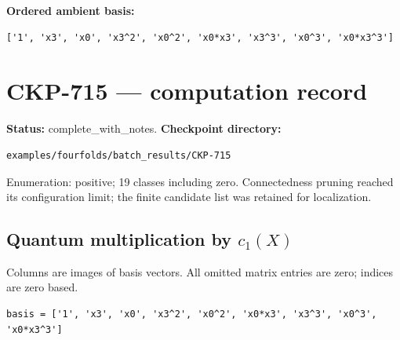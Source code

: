 \documentclass[10pt,a4paper]{article}
\begin{document}
\textbf{Ordered ambient basis:}
\begin{lstlisting}
['1', 'x3', 'x0', 'x3^2', 'x0^2', 'x0*x3', 'x3^3', 'x0^3', 'x0*x3^3']
\end{lstlisting}

\clearpage\section*{CKP-715 --- computation record}
\textbf{Status:} complete\_with\_notes.
\textbf{Checkpoint directory:}
\begin{lstlisting}
examples/fourfolds/batch_results/CKP-715
\end{lstlisting}

Enumeration: positive; 19 classes including zero.
Connectedness pruning reached its configuration limit; the finite candidate list was retained for localization.
\subsection*{Quantum multiplication by $c_1(X)$}
Columns are images of basis vectors. All omitted matrix entries are zero; indices are zero based.

\begin{lstlisting}
basis = ['1', 'x3', 'x0', 'x3^2', 'x0^2', 'x0*x3', 'x3^3', 'x0^3', 'x0*x3^3']
\end{lstlisting}
\end{document}
